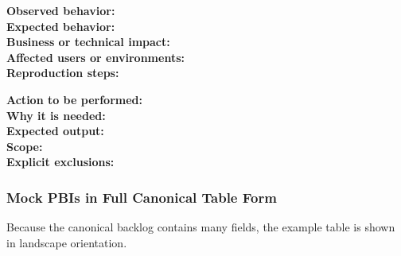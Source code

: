 \documentclass[11pt,a4paper]{article}
\begin{document}
\begin{tcolorbox}[colback=white,colframe=black,title=Bug --- Description Template]
\textbf{Observed behavior:} \\
\textbf{Expected behavior:} \\
\textbf{Business or technical impact:} \\
\textbf{Affected users or environments:} \\
\textbf{Reproduction steps:}
\end{tcolorbox}

\begin{tcolorbox}[colback=white,colframe=black,title=Task --- Description Template]
\textbf{Action to be performed:} \\
\textbf{Why it is needed:} \\
\textbf{Expected output:} \\
\textbf{Scope:} \\
\textbf{Explicit exclusions:}
\end{tcolorbox}

\subsubsection*{Mock PBIs in Full Canonical Table Form}

Because the canonical backlog contains many fields, the example table is shown in landscape orientation.
\end{document}
